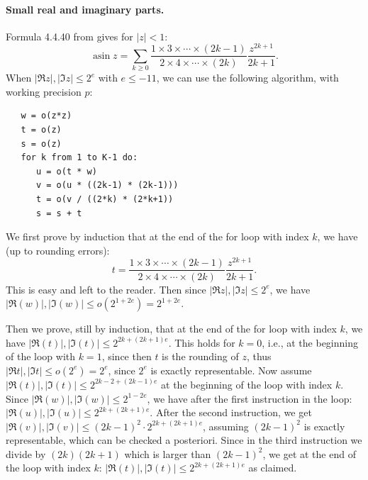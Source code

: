 \documentclass [11pt]{article}
\newcommand {\asin}{\operatorname {asin}}
\renewcommand {\leq}{\leqslant}
\renewcommand {\geq}{\geqslant}
\begin{document}
\paragraph{Small real and imaginary parts.}
Formula 4.4.40 from \cite{AbSt73} gives for $|z| < 1$:
\begin{equation} \label{eq_asin1}
  \asin z = \sum_{k \geq 0} \frac{1 \times 3 \times \cdots \times (2k-1)}
  {2 \times 4 \times \cdots \times (2k)} \frac{z^{2k+1}}{2k+1}.
\end{equation}
When $|\Re z|,|\Im z| \leq 2^e$ with $e \leq -11$,
we can use the following algorithm, with working precision $p$:
\begin{verbatim}
   w = o(z*z)
   t = o(z)
   s = o(z)
   for k from 1 to K-1 do:
      u = o(t * w)
      v = o(u * ((2k-1) * (2k-1)))
      t = o(v / ((2*k) * (2*k+1))
      s = s + t
\end{verbatim}
We first prove by induction that at the end of the for loop with index $k$,
we have (up to rounding errors):
\[ t = \frac{1  \times 3 \times \cdots \times (2k-1)}
  {2 \times 4 \times \cdots \times (2k)} \frac{z^{2k+1}}{2k+1}. \]
This is easy and left to the reader.
Then since $|\Re z|,|\Im z| \leq 2^e$,
we have $|\Re(w)|,|\Im(w)| \leq o(2^{1+2e}) = 2^{1+2e}$.

Then we prove, still by induction, that at the end of the for loop with index
$k$, we have $|\Re(t)|,|\Im(t)| \leq 2^{2k+(2k+1)e}$.
This holds for $k=0$, i.e., at the beginning of the loop with $k=1$,
since then $t$ is the rounding of $z$,
thus $|\Re t|,|\Im t| \leq o(2^e) = 2^e$,
since $2^e$ is exactly representable.
Now assume $|\Re(t)|,|\Im(t)| \leq 2^{2k-2+(2k-1)e}$ at the beginning of the
loop with index $k$.
Since $|\Re(w)|,|\Im(w)| \leq 2^{1-2e}$, we have after the first instruction
in the loop: $|\Re(u)|, |\Im(u)| \leq 2^{2k+(2k+1)e}$. After the second
instruction, we get $|\Re(v)|, |\Im(v)| \leq (2k-1)^2 \cdot 2^{2k+(2k+1)e}$,
assuming $(2k-1)^2$ is exactly representable, which can be checked a
posteriori. Since in the third instruction we divide by $(2k)(2k+1)$
which is larger than $(2k-1)^2$, we get at the end of the loop with index $k$:
$|\Re(t)|, |\Im(t)| \leq 2^{2k+(2k+1)e}$ as claimed.
\end{document}
